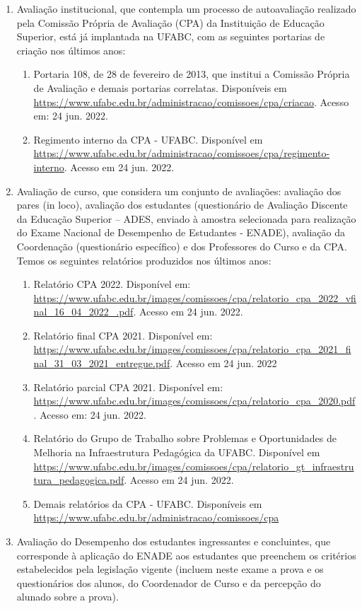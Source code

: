 \documentclass{article}
\begin{document}
\begin{enumerate}
	\item Avaliação institucional, que contempla um processo de autoavaliação realizado pela Comissão Própria de Avaliação (CPA) da Instituição de Educação Superior, está já implantada na UFABC, com as seguintes portarias de criação nos últimos anos:
	\begin{enumerate}
		\item Portaria 108, de 28 de fevereiro de 2013, que institui a Comissão Própria de Avaliação e demais portarias correlatas. Disponíveis em
\url{https://www.ufabc.edu.br/administracao/comissoes/cpa/criacao}. Acesso em: 24 jun. 2022.
		\item Regimento interno da CPA - UFABC. Disponível em \url{https://www.ufabc.edu.br/administracao/comissoes/cpa/regimento-interno}. Acesso em 24 jun. 2022.
	\end{enumerate}

	\item Avaliação de curso, que considera um conjunto de avaliações: avaliação dos pares (in loco), avaliação dos estudantes (questionário de Avaliação Discente da Educação Superior – ADES, enviado à amostra selecionada para realização do Exame Nacional de Desempenho de Estudantes - ENADE), avaliação da Coordenação (questionário específico) e dos Professores do Curso e da CPA. Temos os seguintes relatórios produzidos nos últimos anos:
	\begin{enumerate}
		\item Relatório CPA 2022. Disponível em:
		\url{https://www.ufabc.edu.br/images/comissoes/cpa/relatorio_cpa_2022_vfinal_16_04_2022_.pdf}. Acesso em 24 jun. 2022.
		\item Relatório final CPA 2021. Disponível em:
		\url{https://www.ufabc.edu.br/images/comissoes/cpa/relatorio_cpa_2021_final_31_03_2021_entregue.pdf}. Acesso em 24 jun. 2022
		\item Relatório parcial CPA 2021. Disponível em:
\url{https://www.ufabc.edu.br/images/comissoes/cpa/relatorio_cpa_2020.pdf}. Acesso em: 24 jun. 2022.
		\item Relatório do Grupo de Trabalho sobre Problemas e Oportunidades de Melhoria na Infraestrutura Pedagógica da UFABC. Disponível em \url {https://www.ufabc.edu.br/images/comissoes/cpa/relatorio_gt_infraestrutura_pedagogica.pdf}. Acesso em 24 jun. 2022.
		\item Demais relatórios da CPA - UFABC. Disponíveis em  \url{https://www.ufabc.edu.br/administracao/comissoes/cpa}
	\end{enumerate}

	\item Avaliação do Desempenho dos estudantes ingressantes e concluintes, que corresponde à aplicação do ENADE aos estudantes que preenchem os critérios estabelecidos pela legislação vigente (incluem neste exame a prova e os questionários dos alunos, do Coordenador de Curso e da percepção do alunado sobre a prova).
\end{enumerate}
\end{document}

